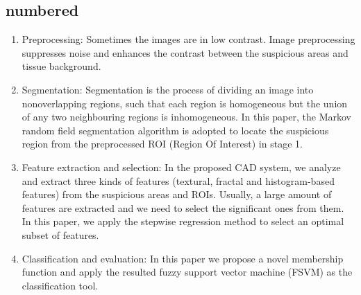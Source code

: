 \subsection{numbered}
\begin{enumerate}
       
\item  Preprocessing: Sometimes the images are in low contrast. Image preprocessing suppresses noise and enhances the contrast between the suspicious areas and tissue background. 
\item Segmentation: Segmentation is the process of dividing an image into nonoverlapping regions, such that each region
is homogeneous but the union of any two neighbouring regions is inhomogeneous. In this paper, the Markov random field segmentation algorithm is adopted to locate the suspicious region from the preprocessed ROI (Region Of Interest) in stage 1. 
\item Feature extraction and selection: In the proposed CAD system, we analyze and extract three kinds of features (textural, fractal and histogram-based features) from the suspicious areas and ROIs. Usually, a large amount of features are extracted and we need to select the significant ones from them. In this paper, we apply the stepwise regression method to select an optimal subset of features.
\item Classification and evaluation: In this paper we propose a novel membership function and apply the resulted fuzzy support vector machine (FSVM) as the classification tool. 

\end{enumerate}
